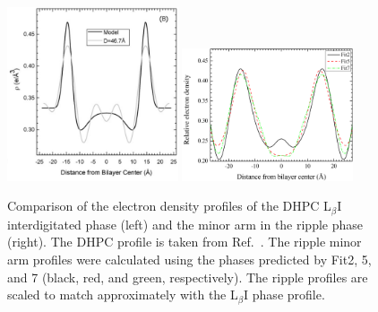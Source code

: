 \begin{figure}[htbp]
  \centering
  \includegraphics[width=0.45\textwidth]{figures/ripple/discussion/Guler_interdigitated_DHPC}
  \includegraphics[width=0.45\textwidth]{figures/ripple/discussion/minor_edp}
  \caption{Comparison of the electron density profiles of the DHPC  
  L$_\beta\text{I}$ interdigitated phase (left)
  and the minor arm in the ripple phase (right). The DHPC profile is taken from 
  Ref.~\cite{ref:Guler09}. The ripple minor arm profiles were calculated 
  using the phases predicted by Fit2, 5, and 7 (black, red, and green, respectively). 
  The ripple profiles are scaled to match approximately
  with the L$_\beta\text{I}$ phase profile.}
  \label{fig:interdigitation_comparison}
\end{figure}

